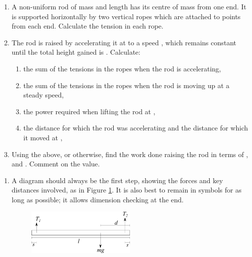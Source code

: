 
\begin{problem} %
{\begin{enumerate}
	\item A non-uniform rod of mass  and length  has its centre of mass  from one end. It is supported horizontally by two vertical ropes which are attached to points  from each end. Calculate the tension in each rope.
	\item The rod is raised by accelerating it at  to a speed , which remains constant until the total height gained is . Calculate:
	\begin{enumerate}
		\item the sum of the tensions in the ropes when the rod is accelerating,
		\item the sum of the tensions in the ropes when the rod is moving up at a steady speed,
		\item the power required when lifting the rod at ,
		\item the distance for which the rod was accelerating and the distance for which it moved at ,
	\end{enumerate}
	\item Using the above, or otherwise, find the work done raising the rod in terms of ,  and . Comment on the value.
\end{enumerate}
}
{}
{\begin{enumerate}
	\item A diagram should always be the first step, showing the forces and key distances involved, as in Figure \ref{fig:Dynamics_rod_forces}. It is also best to remain in symbols for as long as possible; it allows dimension checking at the end.

\begin{figure}[h]
\centering
\includegraphics[width=0.5\textwidth]{../../../figures/Dynamics_rod_forces.svg}
\caption{}\label{fig:Dynamics_rod_forces}
\end{figure}


\end{enumerate}}
\end{problem}
